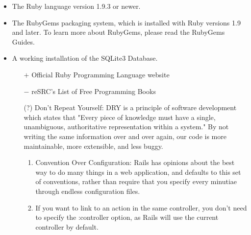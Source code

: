 \documentclass[14pt]{report}
\author{Group 09-218}
\begin{document}
	\newpage
	\begin{itemize}
		\item The Ruby language version 1.9.3 or newer.
		\item The RubyGems packaging system, which is installed with Ruby versions 1.9 and later. To learn more about RubyGems, please read the RubyGems Guides.
		\item A working installation of the SQLite3 Database.
		\begin{itemize}
			\item[$+$] Official Ruby Programming Language website
			\item[$-$] reSRC's List of Free Programming Books
			\item[(?)] Don't Repeat Yourself: DRY is a principle of software development which states that "Every piece of knowledge must have a single, unambiguous, authoritative representation within a system." By not writing the same information over and over again, our code is more maintainable, more extensible, and less buggy.
			\renewcommand{\theenumi}{(\asbuk{enumi})}
			\begin{enumerate}
				\item\label{boss} Convention Over Configuration: Rails has opinions about the best way to do many things in a web application, and defaults to this set of conventions, rather than require that you specify every minutiae through endless configuration files.
				\item If you want to link to an action in the same controller, you don't need to specify the :controller option, as Rails will use the current controller by default.
			\end{enumerate}
		\end{itemize}
	\end{itemize}
\end{document}
